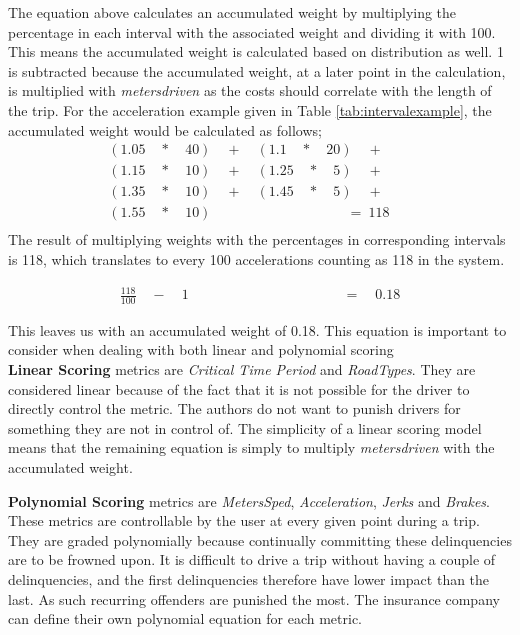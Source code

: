 The equation above calculates an accumulated weight by multiplying the percentage in each interval with the associated weight and dividing it with 100. This means the accumulated weight is calculated based on distribution as well. 1 is subtracted because the accumulated weight, at a later point in the calculation, is multiplied with \textit{metersdriven} as the costs should correlate with the length of the trip. For the acceleration example given in Table \ref{tab:intervalexample}, the accumulated weight would be calculated as follows;
\begin{align*}
(1.05\quad *\quad 40)\quad +\quad (1.1\quad *\quad 20)\quad +\quad \quad \\ 
  (1.15\quad *\quad 10)\quad +\quad (1.25\quad *\quad 5)\quad +\quad \quad \\
  (1.35\quad *\quad 10)\quad +\quad (1.45\quad *\quad 5)\quad +\quad \quad \\
  (1.55\quad *\quad 10)\quad \quad \quad \quad \quad \quad \quad \quad \ \ \ \quad =\ 118 \\
\end{align*}
The result of multiplying weights with the percentages in corresponding intervals is 118, which translates to every 100 accelerations counting as 118 in the system.

\begin{align*}
\frac { 118 }{ 100 } \quad -\quad 1\quad \quad \quad \quad \quad \quad \quad \quad \quad \quad \quad  =\quad 0.18
\end{align*}


This leaves us with an accumulated weight of 0.18. This equation is important to consider when dealing with both linear and polynomial scoring\\

\textbf{Linear Scoring} metrics are \textit{Critical Time Period} and \textit{RoadTypes}. They are considered linear because of the fact that it is not possible for the driver to directly control the metric. The authors do not want to punish drivers for something they are not in control of. 
The simplicity of a linear scoring model means that the remaining equation is simply to multiply \textit{metersdriven} with the accumulated weight.

\textbf{Polynomial Scoring} metrics are \textit{MetersSped}, \textit{Acceleration}, \textit{Jerks} and \textit{Brakes}. These metrics are controllable by the user at every given point during a trip. They are graded polynomially because continually committing these delinquencies are to be frowned upon. It is difficult to drive a trip without having a couple of delinquencies, and the first delinquencies therefore have lower impact than the last. As such recurring offenders are punished the most. The insurance company can define their own polynomial equation for each metric.

